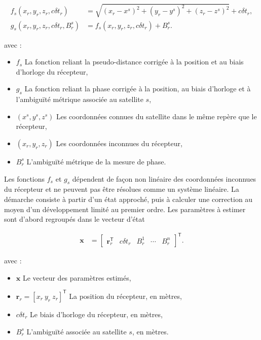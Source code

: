\begin{align}
f_s(x_r,y_r,z_r,c\delta t_r)
&=
\sqrt{(x_r-x^s)^2+(y_r-y^s)^2+(z_r-z^s)^2}
+c\delta t_r,
\label{ann:eq:code_observation_function}
\\
g_s(x_r,y_r,z_r,c\delta t_r,B_r^s)
&=
f_s(x_r,y_r,z_r,c\delta t_r)+B_r^s.
\label{ann:eq:phase_observation_function}
\end{align}

avec :

\begin{itemize}
    \item $f_s$ La fonction reliant la pseudo-distance corrigée à la position et au biais d'horloge du récepteur,
    \item $g_s$ La fonction reliant la phase corrigée à la position, au biais d'horloge et à l'ambiguïté métrique associée au satellite $s$,
    \item $(x^s,y^s,z^s)$ Les coordonnées connues du satellite dans le même
    repère que le récepteur,
    \item $(x_r,y_r,z_r)$ Les coordonnées inconnues du récepteur,
    \item $B_r^s$ L'ambiguïté métrique de la mesure de phase.
\end{itemize}


Les fonctions $f_s$ et $g_s$ dépendent de façon non linéaire des
coordonnées inconnues du récepteur et ne peuvent pas être résolues
comme un système linéaire. La démarche consiste à partir d'un état approché,
puis à calculer une correction au moyen d'un développement limité au premier
ordre. Les paramètres à estimer sont d'abord regroupés dans le vecteur d'état

\begin{align}
\mathbf x
&=
\begin{bmatrix}
\mathbf r_r^{\mathsf T} & c\delta t_r & B_r^1 & \cdots & B_r^n
\end{bmatrix}^{\mathsf T}.
\label{ann:eq:static_state_vector}
\end{align}

avec :

\begin{itemize}
    \item $\mathbf x$ Le vecteur des paramètres estimés,
    \item $\mathbf r_r=[x_r\ y_r\ z_r]^{\mathsf T}$ La position du
    récepteur, en mètres,
    \item $c\delta t_r$ Le biais d'horloge du récepteur, en mètres,
    \item $B_r^s$ L'ambiguïté associée au satellite $s$, en mètres.
\end{itemize}


